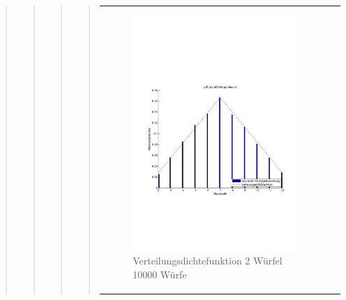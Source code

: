 \begin{quote}
\begin{quote}
\begin{quote}
\begin{quote}
\begin{center}
\begin{tabular}{ll}
\begin{minipage}{0.6\textwidth}
                \end{minipage}
                \begin{minipage}{0.6\textwidth}

                    \begin{figure}[H]
                        \label{fig:}
                        \includegraphics[scale=0.3]{./Bilder/2wuerfelpdf} %
                        \caption{Verteilungsdichtefunktion 2 Würfel 10000 Würfe}
                    \end{figure}
                \vspace{-1.5em}

                \end{minipage}

            \end{tabular}
            \end{center}


\end{quote}
\end{quote}
\end{quote}
\end{quote}
